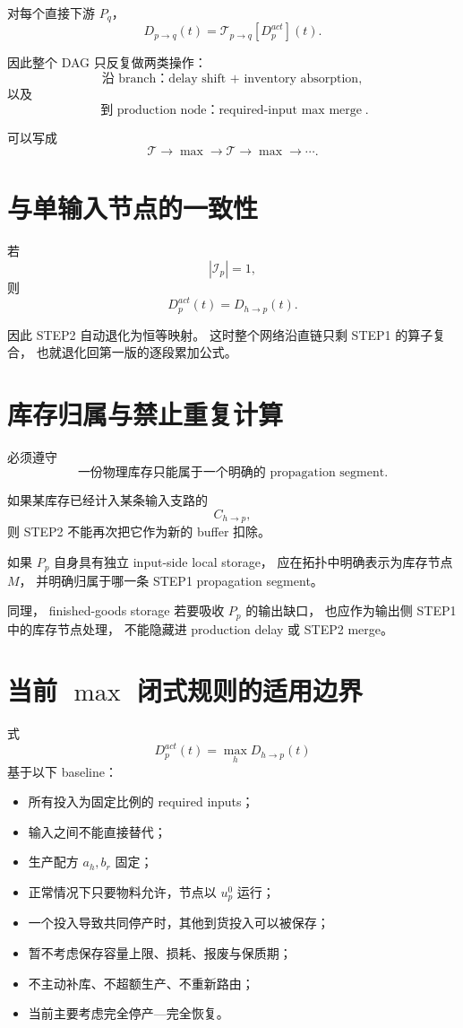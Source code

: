 \documentclass[UTF8,11pt]{ctexart}
\begin{document}
对每个直接下游 \(P_q\)，
\[
\boxed{
D_{p\to q}(t)
=
\mathcal T_{p\to q}[D_p^{act}](t).
}
\tag{32}
\]

因此整个 DAG 只反复做两类操作：
\[
\boxed{
\text{沿 branch：delay shift + inventory absorption},
}
\]
以及
\[
\boxed{
\text{到 production node：required-input \(\max\) merge}.
}
\]

可以写成
\[
\boxed{
\mathcal T
\rightarrow
\max
\rightarrow
\mathcal T
\rightarrow
\max
\rightarrow\cdots.
}
\tag{33}
\]

\section{与单输入节点的一致性}

若
\[
|\mathcal I_p|=1,
\]
则
\[
\boxed{
D_p^{act}(t)
=
D_{h\to p}(t).
}
\tag{34}
\]

因此 STEP2 自动退化为恒等映射。
这时整个网络沿直链只剩 STEP1 的算子复合，
也就退化回第一版的逐段累加公式。

\section{库存归属与禁止重复计算}

必须遵守
\[
\boxed{
\text{一份物理库存只能属于一个明确的 propagation segment}.
}
\]

如果某库存已经计入某条输入支路的
\[
C_{h\to p},
\]
则 STEP2 不能再次把它作为新的 buffer 扣除。

如果 \(P_p\) 自身具有独立 input-side local storage，
应在拓扑中明确表示为库存节点 \(M\)，
并明确归属于哪一条 STEP1 propagation segment。

同理，
finished-goods storage 若要吸收 \(P_p\) 的输出缺口，
也应作为输出侧 STEP1 中的库存节点处理，
不能隐藏进 production delay 或 STEP2 merge。

\section{当前 \(\max\) 闭式规则的适用边界}

式
\[
D_p^{act}(t)=\max_hD_{h\to p}(t)
\]
基于以下 baseline：
\begin{itemize}
    \item 所有投入为固定比例的 required inputs；
    \item 输入之间不能直接替代；
    \item 生产配方 \(a_h,b_r\) 固定；
    \item 正常情况下只要物料允许，节点以 \(u_p^0\) 运行；
    \item 一个投入导致共同停产时，其他到货投入可以被保存；
    \item 暂不考虑保存容量上限、损耗、报废与保质期；
    \item 不主动补库、不超额生产、不重新路由；
    \item 当前主要考虑完全停产---完全恢复。
\end{itemize}
\end{document}
